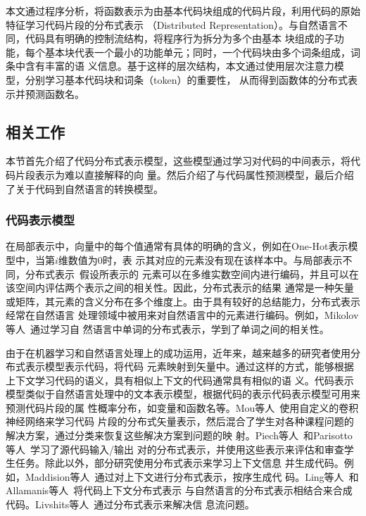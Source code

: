 本文通过程序分析，将函数表示为由基本代码块组成的代码片段，利用代码的原始特征学习代码片段的分布式表示
（Distributed Representation）。与自然语言不同，代码具有明确的控制流结构，将程序行为拆分为多个由基本
块组成的子功能，每个基本块代表一个最小的功能单元；同时，一个代码块由多个词条组成，词条中含有丰富的语
义信息。基于这样的层次结构，本文通过使用层次注意力模型，分别学习基本代码块和词条（token）的重要性，
从而得到函数体的分布式表示并预测函数名。

\subsection{相关工作}
本节首先介绍了代码分布式表示模型，这些模型通过学习对代码的中间表示，将代码片段表示为难以直接解释的向
量。然后介绍了与代码属性预测模型，最后介绍了关于代码到自然语言的转换模型。

\subsubsection{代码表示模型}
在局部表示中，向量中的每个值通常有具体的明确的含义，例如在One-Hot表示模型中，当第$i$维数值为0时，表
示其对应的元素没有现在该样本中。与局部表示不同，分布式表示~\cite{hinton1984distributed}假设所表示的
元素可以在多维实数空间内进行编码，并且可以在该空间内评估两个表示之间的相关性。因此，分布式表示的结果
通常是一种矢量或矩阵，其元素的含义分布在多个维度上。由于具有较好的总结能力，分布式表示经常在自然语言
处理领域中被用来对自然语言中的元素进行编码。例如，Mikolov等人~\cite{mikolov2013efficient}通过学习自
然语言中单词的分布式表示，学到了单词之间的相关性。

由于在机器学习和自然语言处理上的成功运用，近年来，越来越多的研究者使用分布式表示模型表示代码，将代码
元素映射到矢量中。通过这样的方式，能够根据上下文学习代码的语义，具有相似上下文的代码通常具有相似的语
义。代码表示模型类似于自然语言处理中的文本表示模型，根据代码的表示代码表示模型可用来预测代码片段的属
性概率分布，如变量和函数名等。Mou等人~\cite{mou2016convolutional}使用自定义的卷积神经网络来学习代码
片段的分布式矢量表示，然后混合了学生对各种课程问题的解决方案，通过分类来恢复这些解决方案到问题的映
射。Piech等人~\cite{piech2015learning}和Parisotto等人~\cite{parisotto2017neuro}学习了源代码输入/输出
对的分布式表示，并使用这些表示来评估和审查学生任务。除此以外，部分研究使用分布式表示来学习上下文信息
并生成代码。例如，Maddision等人~\cite{maddison2014structured}通过对上下文进行分布式表示，按序生成代
码。Ling等人~\cite{ling2016latent}和Allamanis等人~\cite{allamanis2015bimodal}将代码上下文分布式表示
与自然语言的分布式表示相结合来合成代码。Livshits等人~\cite{livshits2009merlin}通过分布式表示来解决信
息流问题。

